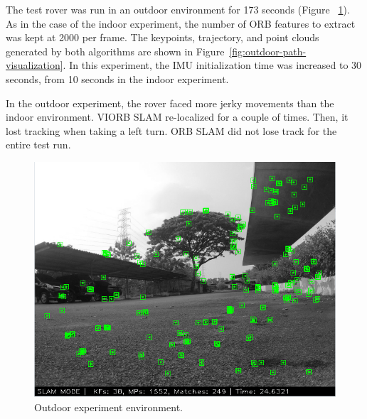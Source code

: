 The test rover was run in an outdoor environment for 173 seconds (Figure ~\ref{fig:outdoor-experiment-live}). As in the case of the indoor experiment, the number of ORB 
features to extract was kept at 2000 per frame. The keypoints, trajectory, and point clouds generated by both algorithms are shown in Figure~\ref{fig:outdoor-path-visualization}. In this experiment, the IMU initialization time was increased to 30 seconds, from 10 seconds in the indoor experiment.

In the outdoor experiment, the rover faced more jerky movements than the 	indoor environment. VIORB SLAM re-localized for a couple of times. Then, it lost tracking when taking a left turn. ORB SLAM did not lose track for the entire test run.

\begin{figure}[h]
	\centering
	\includegraphics[width=5.5in]{figures/demo3_screen}
	\caption[Outdoor experiment environment]{\small 
		Outdoor experiment environment. }
	\label{fig:outdoor-experiment-live}
\end{figure}


